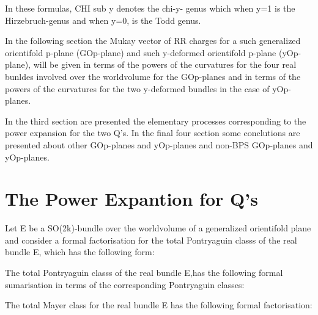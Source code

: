 \documentclass[a4paper,a4paper]{article}
\begin{document}
\begin{center}
{  \coordHE{} }
\end{center}
In these formulas, CHI sub y  denotes the chi-y- genus which when y=1 is the Hirzebruch-genus and when y=0, is the Todd genus.


In the following section the Mukay vector of RR charges for a such generalized orientifold p-plane (GOp-plane) and such y-deformed orientifold p-plane (yOp-plane), will be given in terms of the powers of the curvatures for the four real bunldes involved over the worldvolume   for the GOp-planes and in terms of the powers of the curvatures for the two y-deformed bundles in the case of yOp-planes.


 




 In the third section are presented the elementary processes corresponding to the power expansion for the two Q's. In the final four section some conclutions are presented about other GOp-planes and yOp-planes  and non-BPS GOp-planes and yOp-planes.

\section{The Power Expantion for Q's}

Let E be a SO(2k)-bundle over the worldvolume of a generalized orientifold plane and consider a formal factorisation for the total Pontryaguin classs of the real bundle E, which has the following form:

\begin{center}
{  \coordHE{} }
\end{center}
The total Pontryaguin classs of the real bundle E,has the following formal sumarisation in terms of the corresponding Pontryaguin classes: 
\begin{center}
{  \coordHE{} }
\end{center}
The total Mayer class for the real bundle E has the following formal factorisation:
\begin{center}
{  \coordHE{} }
\end{center}
\end{document}
